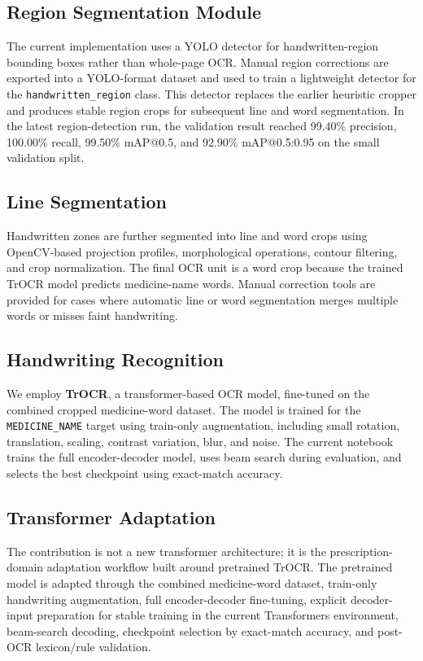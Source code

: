 \documentclass[twocolumn,10pt]{article}
\begin{document}
\subsection{Region Segmentation Module}
The current implementation uses a YOLO detector for handwritten-region bounding boxes rather than whole-page OCR. Manual region corrections are exported into a YOLO-format dataset and used to train a lightweight detector for the \texttt{handwritten\_region} class. This detector replaces the earlier heuristic cropper and produces stable region crops for subsequent line and word segmentation. In the latest region-detection run, the validation result reached 99.40\% precision, 100.00\% recall, 99.50\% mAP@0.5, and 92.90\% mAP@0.5:0.95 on the small validation split.

\subsection{Line Segmentation}
Handwritten zones are further segmented into line and word crops using OpenCV-based projection profiles, morphological operations, contour filtering, and crop normalization. The final OCR unit is a word crop because the trained TrOCR model predicts medicine-name words. Manual correction tools are provided for cases where automatic line or word segmentation merges multiple words or misses faint handwriting.

\subsection{Handwriting Recognition}
We employ \textbf{TrOCR}, a transformer-based OCR model, fine-tuned on the combined cropped medicine-word dataset. The model is trained for the \texttt{MEDICINE\_NAME} target using train-only augmentation, including small rotation, translation, scaling, contrast variation, blur, and noise. The current notebook trains the full encoder-decoder model, uses beam search during evaluation, and selects the best checkpoint using exact-match accuracy.

\subsection{Transformer Adaptation}
The contribution is not a new transformer architecture; it is the prescription-domain adaptation workflow built around pretrained TrOCR. The pretrained model is adapted through the combined medicine-word dataset, train-only handwriting augmentation, full encoder-decoder fine-tuning, explicit decoder-input preparation for stable training in the current Transformers environment, beam-search decoding, checkpoint selection by exact-match accuracy, and post-OCR lexicon/rule validation.
\end{document}

